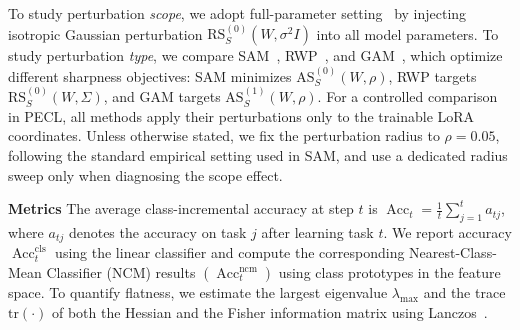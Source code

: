 \documentclass{article}
\theoremstyle{plain}
\theoremstyle{definition}
\theoremstyle{remark}
\begin{document}
To study perturbation \emph{scope}, we adopt {full-parameter} setting~\cite{li2024flatlora} by injecting isotropic Gaussian perturbation $\mathrm{RS}_S^{(0)}({W}, \sigma^2 
I)$ into all model parameters.
To study perturbation \emph{type}, we compare SAM~\cite{foretSharpnessAwareMinimizationEfficiently2021}, RWP~\cite{pmlr-v151-bisla22a}, and GAM~\cite{Zhang_GAM}, which optimize different sharpness objectives: SAM minimizes $\mathrm{AS}^{(0)}_S(W,\rho)$, RWP targets $\mathrm{RS}^{(0)}_S(W,\Sigma)$, and GAM targets $\mathrm{AS}^{(1)}_S(W,\rho)$. For a controlled comparison in PECL, all methods apply their perturbations only to the trainable LoRA coordinates.
Unless otherwise stated, we fix the perturbation radius to $\rho=0.05$, following the standard empirical setting used in SAM, and use a dedicated radius sweep only when diagnosing the scope effect.




\noindent\textbf{Metrics}\quad
The average class-incremental accuracy at step $t$ is
$
\operatorname{Acc}_t = \frac{1}{t} \sum_{j=1}^{t} a_{tj}
$,  where $a_{tj}$ denotes the accuracy on task $j$ after learning task $t$. 
We report accuracy $\operatorname{Acc}_t^{\mathrm{cls}}$ using the linear classifier and
compute the corresponding Nearest-Class-Mean Classifier (NCM) results
$(\operatorname{Acc}_t^{\mathrm{ncm}})$ using class prototypes in the feature space.
To quantify flatness, we estimate the largest eigenvalue $\lambda_{\max}$ and the trace $\mathrm{tr}(\cdot)$ of both the Hessian and the Fisher information matrix using Lanczos~\cite{ghorbaniInvestigationNeuralNet2019}.
\end{document}
